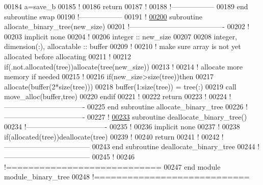 \begin{DoxyCode}
00184     a=save\_b
00185     \textcolor{comment}{!}
00186     return
00187     \textcolor{comment}{!}
00188   \textcolor{comment}{!------------------}
00189 \textcolor{keyword}{  end subroutine swap}
00190   \textcolor{comment}{!------------------}
00191   \textcolor{comment}{!}
\hypertarget{module__binary__tree_8f90_source_l00200}{}\hyperlink{classmodule__binary__tree_a3b5f15e8bcc08bfe14e24f4b1930ea47}{00200}   \textcolor{keyword}{subroutine }allocate\_binary\_tree(new\_size)
00201   \textcolor{comment}{!----------------------------------------}
00202     \textcolor{comment}{!}
00203     \textcolor{keyword}{implicit none}  
00204     \textcolor{comment}{!}
00206     \textcolor{keywordtype}{integer} :: new\_size
00207 
00208     \textcolor{keywordtype}{integer}, \textcolor{keywordtype}{dimension(:)}, \textcolor{keywordtype}{allocatable} :: buffer
00209     \textcolor{comment}{!}
00210     \textcolor{comment}{! make sure array is not yet allocated before allocating}
00211     \textcolor{comment}{!}
00212     \textcolor{keyword}{if}(.not.\textcolor{keyword}{allocated}(tree))\textcolor{keyword}{allocate}(tree(new\_size))
00213     \textcolor{comment}{!}
00214     \textcolor{comment}{! allocate more memory if needed}
00215     \textcolor{comment}{! }
00216     \textcolor{keyword}{if}(new\_size>\textcolor{keyword}{size}(tree))\textcolor{keyword}{then}
00217        \textcolor{keyword}{allocate}(buffer(2*\textcolor{keyword}{size}(tree)))
00218        buffer(1:\textcolor{keyword}{size}(tree)) = tree(:)
00219        call move\_alloc(buffer,tree)
00220     \textcolor{keyword}{endif}
00221     \textcolor{comment}{!}
00222     return
00223     \textcolor{comment}{!}
00224   \textcolor{comment}{!----------------------------------}
00225 \textcolor{keyword}{  end subroutine allocate\_binary\_tree}
00226   \textcolor{comment}{!----------------------------------}
00227   \textcolor{comment}{!}
\hypertarget{module__binary__tree_8f90_source_l00233}{}\hyperlink{classmodule__binary__tree_aa34576eb21fe1f7d974ab467d449d49c}{00233}   \textcolor{keyword}{subroutine }deallocate\_binary\_tree()
00234   \textcolor{comment}{!----------------------------------}
00235     \textcolor{comment}{!}
00236     \textcolor{keyword}{implicit none} 
00237     \textcolor{comment}{!}
00238     \textcolor{keyword}{if}(\textcolor{keyword}{allocated}(tree))\textcolor{keyword}{deallocate}(tree)
00239     \textcolor{comment}{!}
00240     return
00241     \textcolor{comment}{!}
00242   \textcolor{comment}{!------------------------------------}
00243 \textcolor{keyword}{  end subroutine deallocate\_binary\_tree}
00244   \textcolor{comment}{!------------------------------------}
00245   \textcolor{comment}{!}
00246 \textcolor{comment}{!============================}
00247 \textcolor{keyword}{end module module\_binary\_tree}
00248 \textcolor{comment}{!============================}
\end{DoxyCode}

